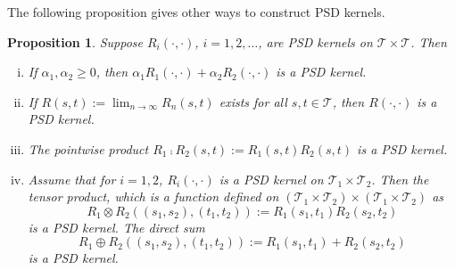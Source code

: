 \documentclass[11pt]{article}
\theoremstyle{plain}
\newtheorem{proposition}{\quad\quad Proposition}
\theoremstyle{definition}
\theoremstyle{remark}
\begin{document}
The following proposition gives other ways to construct PSD kernels.




\begin{proposition}\label{prop1}
    Suppose $R_i(\cdot,\cdot)$, $i=1,2,\ldots$, are PSD kernels on $\mathcal{T} \times \mathcal{T}$. Then
    \begin{enumerate}[(i)]
        \item If $\alpha_1,\alpha_2 \geq 0 $, then $\alpha_1 R_1(\cdot,\cdot)+\alpha_2 R_2(\cdot,\cdot)$ is a PSD kernel.
        \item If $R(s,t):=\lim_{n\to \infty} R_n(s,t)$ exists for all $s,t\in \mathcal{T}$, then $R(\cdot,\cdot)$ is a PSD kernel.
        \item The pointwise product $R_1\comp R_2 (s,t):=R_1(s,t)R_2(s,t)$ is a PSD kernel.
        \item 
            Assume that for $i=1,2$, $R_i(\cdot,\cdot)$ is a PSD kernel on $\mathcal{T}_1 \times \mathcal{T}_2$.
        Then the tensor product, which is a function defined on $(\mathcal{T}_1\times \mathcal{T}_2)\times (\mathcal{T}_1\times \mathcal{T}_2)$ as 
            \begin{equation*}
                R_1 \otimes R_2 \left((s_1,s_2),(t_1,t_2)\right)
                := R_1 (s_1,t_1) R_2(s_2,t_2)
            \end{equation*}
            is a PSD kernel.
            The direct sum
            \begin{equation*}
                R_1 \oplus R_2 \left((s_1,s_2),(t_1,t_2)\right)
                :=
                R_1 (s_1,t_1) + R_2(s_2,t_2)
            \end{equation*}
            is a PSD kernel.
    \end{enumerate}
\end{proposition}
\end{document}
